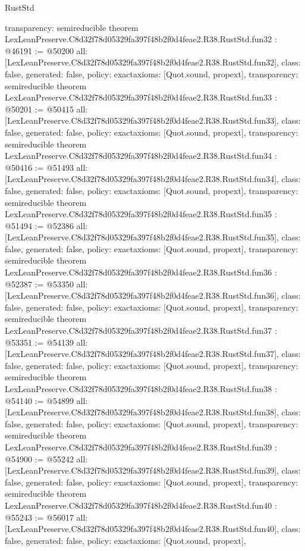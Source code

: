 \begin{lexlean}{RustStd}
\begin{coremodule}
{  transparency: semireducible
}
theorem LexLeanPreserve.C8d32f78d05329fa397f48b2f0d4feae2.R38.RustStd.fun32 : @46191 := @50200 {
  all: [LexLeanPreserve.C8d32f78d05329fa397f48b2f0d4feae2.R38.RustStd.fun32],
  class: false,
  generated: false,
  policy: exact{axioms: [Quot.sound, propext]},
  transparency: semireducible
}
theorem LexLeanPreserve.C8d32f78d05329fa397f48b2f0d4feae2.R38.RustStd.fun33 : @50201 := @50415 {
  all: [LexLeanPreserve.C8d32f78d05329fa397f48b2f0d4feae2.R38.RustStd.fun33],
  class: false,
  generated: false,
  policy: exact{axioms: [Quot.sound, propext]},
  transparency: semireducible
}
theorem LexLeanPreserve.C8d32f78d05329fa397f48b2f0d4feae2.R38.RustStd.fun34 : @50416 := @51493 {
  all: [LexLeanPreserve.C8d32f78d05329fa397f48b2f0d4feae2.R38.RustStd.fun34],
  class: false,
  generated: false,
  policy: exact{axioms: [Quot.sound, propext]},
  transparency: semireducible
}
theorem LexLeanPreserve.C8d32f78d05329fa397f48b2f0d4feae2.R38.RustStd.fun35 : @51494 := @52386 {
  all: [LexLeanPreserve.C8d32f78d05329fa397f48b2f0d4feae2.R38.RustStd.fun35],
  class: false,
  generated: false,
  policy: exact{axioms: [Quot.sound, propext]},
  transparency: semireducible
}
theorem LexLeanPreserve.C8d32f78d05329fa397f48b2f0d4feae2.R38.RustStd.fun36 : @52387 := @53350 {
  all: [LexLeanPreserve.C8d32f78d05329fa397f48b2f0d4feae2.R38.RustStd.fun36],
  class: false,
  generated: false,
  policy: exact{axioms: [Quot.sound, propext]},
  transparency: semireducible
}
theorem LexLeanPreserve.C8d32f78d05329fa397f48b2f0d4feae2.R38.RustStd.fun37 : @53351 := @54139 {
  all: [LexLeanPreserve.C8d32f78d05329fa397f48b2f0d4feae2.R38.RustStd.fun37],
  class: false,
  generated: false,
  policy: exact{axioms: [Quot.sound, propext]},
  transparency: semireducible
}
theorem LexLeanPreserve.C8d32f78d05329fa397f48b2f0d4feae2.R38.RustStd.fun38 : @54140 := @54899 {
  all: [LexLeanPreserve.C8d32f78d05329fa397f48b2f0d4feae2.R38.RustStd.fun38],
  class: false,
  generated: false,
  policy: exact{axioms: [Quot.sound, propext]},
  transparency: semireducible
}
theorem LexLeanPreserve.C8d32f78d05329fa397f48b2f0d4feae2.R38.RustStd.fun39 : @54900 := @55242 {
  all: [LexLeanPreserve.C8d32f78d05329fa397f48b2f0d4feae2.R38.RustStd.fun39],
  class: false,
  generated: false,
  policy: exact{axioms: [Quot.sound, propext]},
  transparency: semireducible
}
theorem LexLeanPreserve.C8d32f78d05329fa397f48b2f0d4feae2.R38.RustStd.fun40 : @55243 := @56017 {
  all: [LexLeanPreserve.C8d32f78d05329fa397f48b2f0d4feae2.R38.RustStd.fun40],
  class: false,
  generated: false,
  policy: exact{axioms: [Quot.sound, propext]},
}
\end{coremodule}
\end{lexlean}
